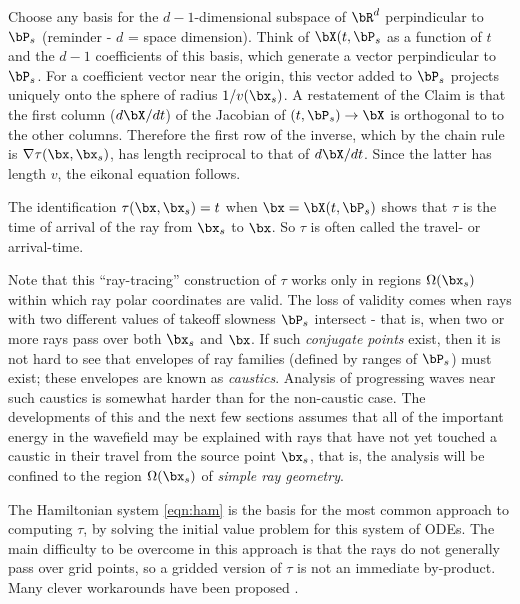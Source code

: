 Choose any basis for the $d-1$-dimensional subspace of $\bR^d$
perpindicular to $\bP_s$ (reminder - $d$ = space dimension). Think of
$\bX(t,\bP_s$ as a function of $t$ and the $d-1$ coefficients of this
basis, which generate a vector perpindicular to $\bP_s$. For a
coefficient vector near the origin, this vector added to $\bP_s$
projects uniquely onto the sphere of radius $1/v(\bx_s)$. A
restatement of the Claim is that the first column ($d\bX/dt$) of the
Jacobian of $(t,\bP_s) \rightarrow \bX$ is orthogonal to to the other
columns. Therefore the first row of the inverse, which by the chain
rule is $\nabla \tau(\bx,\bx_s)$, has length reciprocal to that of
$d\bX/dt$. Since the latter has length $v$, the eikonal equation
follows.

The identification $\tau(\bx,\bx_s) = t$ when $\bx=\bX(t,\bP_s)$
shows that $\tau$ is the time of arrival of the ray from
$\bx_s$ to $\bx$. So $\tau$ is often called the travel- or arrival-time.

Note that this ``ray-tracing'' construction of $\tau$ works only in
regions $\Omega(\bx_s)$ within which ray polar coordinates are
valid. The loss of validity comes when rays with two different values
of takeoff slowness $\bP_s$ intersect - that is, when two or more rays
pass over both $\bx_s$ and $\bx$. If such {\em conjugate points}
exist, then it is not hard to see that envelopes of ray families
(defined by ranges of $\bP_s$) must exist; these envelopes are known
as {\em caustics}. Analysis of progressing waves near such caustics is
somewhat harder than for the non-caustic case. The developments of
this and the next few sections assumes that all of the important
energy in the wavefield may be explained with rays that have not yet
touched a caustic in their travel from the source point $\bx_s$, that
is, the analysis will be confined to the region $\Omega(\bx_s)$ of
{\em simple ray geometry}.

The Hamiltonian system \ref{eqn:ham} is the basis for the most common
approach to computing $\tau$, by solving the initial value problem for
this system of ODEs. The main difficulty to be overcome in this
approach is that the rays do not generally pass over grid points, so a
gridded version of $\tau$ is not an immediate by-product. Many clever
workarounds have been proposed \cite[]{Chapman:85,Vinje:93a}.

